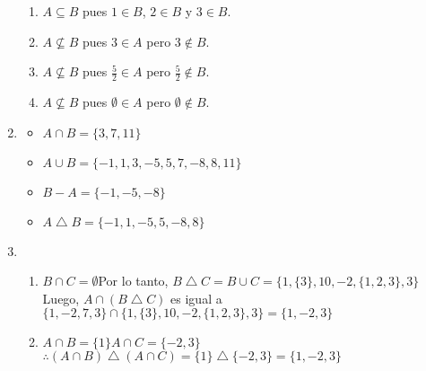 \begin{enumerate}
\begin{multicols}{2}
\begin{enumerate}
  \item $A \subseteq B$ pues $1 \in B$, $2 \in B$ y $3 \in B$.
  \item $A \not\subseteq B$ pues $3 \in A$ pero $3 \notin B$.
  \item $A \not\subseteq B$ pues $\frac{5}{2} \in A$ pero $\frac{5}{2} \notin B$.
  \item $A \not\subseteq B$ pues $\emptyset \in A$ pero $\emptyset \notin B$.
  \end{enumerate}
  \end{multicols}
\item %
  \begin{multicols}{2}
  \begin{itemize}
  \item $A \cap B = \{3, 7, 11\}$
  \item $A \cup B = \{-1,1,3,-5,5,7,-8,8,11\}$
  \item $B - A = \{-1,-5,-8\}$
  \item $A \bigtriangleup B = \{-1,1,-5,5,-8,8\}$
  \end{itemize}
  \end{multicols}
\item %
  \begin{enumerate}
  \item $B \cap C = \emptyset$\newline Por lo tanto, $B \bigtriangleup C = B \cup C = \{1,\{3\},10,-2,\{1,2,3\},3\}$\newline Luego, $A \cap (B \bigtriangleup C)$ es igual a\newline \indent$\{1,-2,7,3\} \cap \{1,\{3\},10,-2,\{1,2,3\},3\} = \{1,-2,3\}$

  \item $A \cap B = \{1\}$\newline $A \cap C = \{-2,3\}$\newline $\therefore (A \cap B) \bigtriangleup (A \cap C) = \{1\} \bigtriangleup \{-2,3\} = \{1,-2,3\}$


\end{enumerate}
\end{enumerate}
